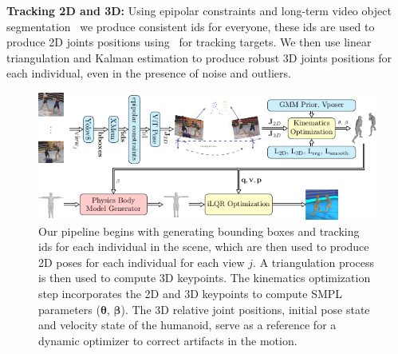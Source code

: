 \documentclass{egpubl}
\begin{document}
\textbf{Tracking 2D and 3D:} Using epipolar constraints and long-term video object segmentation~\cite{cheng2022xmem} we produce consistent ids for everyone, these ids are used to produce 2D joints positions using~\cite{xu2022vitpose} for tracking targets. We then use linear triangulation and Kalman estimation to produce robust 3D joints positions for each individual, even in the presence of noise and outliers.   
\begin{figure}[!ht]
\includegraphics[width=0.75\linewidth]{pipeline.pdf}
 \centering
  \caption{Our pipeline begins with generating bounding boxes and tracking ids for each individual in the scene, which are then used to produce 2D poses for each individual for each view $j$. A triangulation process is then used to compute 3D keypoints. The kinematics optimization step incorporates the 2D and 3D keypoints to compute SMPL parameters ($\mathbf{\theta}$, $\mathbf{\beta}$). The 3D relative joint positions, initial pose state and velocity state of the humanoid, serve as a reference for a dynamic optimizer to correct artifacts in the motion.}
  \label{fig:pipeline}
  \vspace{-8pt}
\end{figure}
\end{document}
